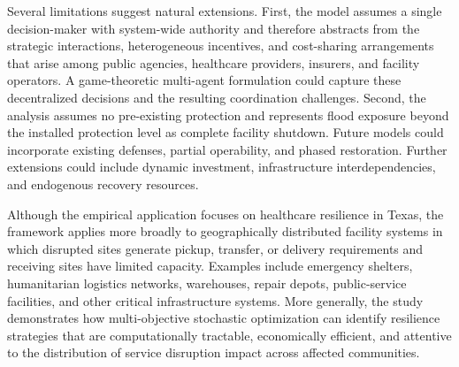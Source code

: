 \documentclass[preprint,11pt,authoryear]{elsarticle}
\begin{document}
Several limitations suggest natural extensions. First, the model assumes a
single decision-maker with system-wide authority and therefore abstracts from
the strategic interactions, heterogeneous incentives, and cost-sharing
arrangements that arise among public agencies, healthcare providers, insurers,
and facility operators. A game-theoretic multi-agent formulation could capture
these decentralized decisions and the resulting coordination challenges.
Second, the analysis assumes no pre-existing protection and represents flood
exposure beyond the installed protection level as complete facility shutdown.
Future models could incorporate existing defenses, partial operability, and
phased restoration. Further extensions could include dynamic investment, infrastructure interdependencies, and endogenous recovery resources.

Although the empirical application focuses on healthcare resilience in Texas,
the framework applies more broadly to geographically distributed facility
systems in which disrupted sites generate pickup, transfer, or delivery
requirements and receiving sites have limited capacity. Examples include emergency shelters, humanitarian
logistics networks, warehouses, repair depots, public-service facilities, and other critical infrastructure systems. More generally, the study demonstrates
how multi-objective stochastic optimization can identify resilience strategies that are computationally tractable, economically efficient, and attentive to the distribution of service disruption impact across affected communities.



\end{document}
